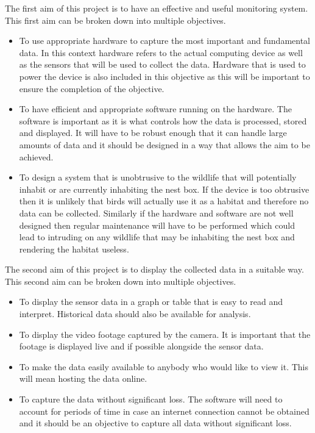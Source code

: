 \documentclass[10pt,a4paper]{article}
\begin{document}
The first aim of this project is to have an effective and useful monitoring system. This first aim can be broken down into multiple objectives. 
\begin{itemize}
\item To use appropriate hardware to capture the most important and fundamental data. In this context hardware refers to the actual computing device as well as the sensors that will be used to collect the data. Hardware that is used to power the device is also included in this objective as this will be important to ensure the completion of the objective.

\item To have efficient and appropriate software running on the hardware. The software is important as it is what controls how the data is processed, stored and displayed. It will have to be robust enough that it can handle large amounts of data and it should be designed in a way that allows the aim to be achieved. 

\item To design a system that is unobtrusive to the wildlife that will potentially inhabit or are currently inhabiting the nest box. If the device is too obtrusive then it is unlikely that birds will actually use it as a habitat and therefore no data can be collected. Similarly if the hardware and software are not well designed then regular maintenance will have to be performed which could lead to intruding on any wildlife that may be inhabiting the nest box and rendering the habitat useless. 
\end{itemize}

The second aim of this project is to display the collected data in a suitable way. This second aim can be broken down into multiple objectives.
\begin{itemize}
\item To display the sensor data in a graph or table that is easy to read and interpret. Historical data should also be available for analysis. 

\item To display the video footage captured by the camera. It is important that the footage is displayed live and if possible alongside the sensor data. 

\item To make the data easily available to anybody who would like to view it. This will mean hosting the data online. 

\item To capture the data without significant loss. The software will need to account for periods of time in case an internet connection cannot be obtained and it should be an objective to capture all data without significant loss. 
\end{itemize}
\end{document}
